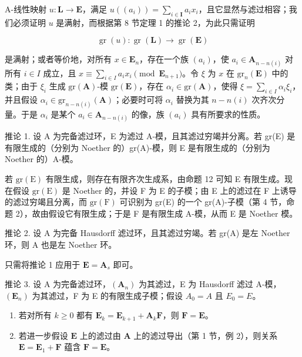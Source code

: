 A-线性映射 \(u: \mathbf{L} \to \mathbf{E}\)，满足 \(u((a_i)) = \sum_{i \in \mathbf{I}} a_i x_i\)，且它显然与滤过相容；我们必须证明 \(u\) 是满射，而根据第 8 节定理 1 的推论 2，为此只需证明

\[
\operatorname{gr} (u): \operatorname{gr} (\mathbf {L}) \rightarrow \operatorname{gr} (\mathbf {E})
\]

	是满射；或者等价地，对所有 \(x \in \mathbf{E}_n\)，存在一个族 \((a_i)\)，使 \(a_i \in \mathbf{A}_{n-n(i)}\) 对所有 \(i \in I\) 成立，且 \(x \equiv \sum_{i \in I} a_i x_i \pmod{\mathbf{E}_{n+1}}\)。令 \(\xi\) 为 \(x\) 在 \(\mathrm{gr}_n(\mathbf{E})\) 中的类；由于 \(\xi_i\) 生成 \(\mathrm{gr}(\mathbf{A})\)-模 \(\mathrm{gr}(\mathbf{E})\)，存在 \(\alpha_i \in \mathrm{gr}(\mathbf{A})\)，使得 \(\xi = \sum_{i \in I} \alpha_i \xi_i\)，并且假设 \(\alpha_i \in \mathrm{gr}_{n-n(i)}(\mathbf{A})\)；必要时可将 \(\alpha_i\) 替换为其 \(n - n(i)\) 次齐次分量。于是 \(\alpha_i\) 是某个 \(a_i \in \mathbf{A}_{n-n(i)}\) 的像，族 \((a_i)\) 具有所要求的性质。

推论 1. 设 A 为完备滤过环，E 为滤过 A-模，且其滤过穷竭并分离。若 gr(E) 是有限生成的（分别为 Noether 的）gr(A)-模，则 E 是有限生成的（分别为 Noether 的）A-模。

若 \(\mathrm{gr}(\mathrm{E})\) 有限生成，则存在有限齐次生成系，由命题 12 可知 E 有限生成。现在假设 \(\mathrm{gr}(\mathrm{E})\) 是 Noether 的，并设 F 为 E 的子模；由 E 上的滤过在 F 上诱导的滤过穷竭且分离，而 \(\mathrm{gr}(\mathrm{F})\) 可识别为 gr(E) 的一个 gr(A)-子模（第 4 节，命题 2），故由假设它有限生成；于是 F 是有限生成 A-模，从而 E 是 Noether 模。

推论 2. 设 A 为完备 Hausdorff 滤过环，且其滤过穷竭。若 gr(A) 是左 Noether 环，则 A 也是左 Noether 环。

只需将推论 1 应用于 \(\mathbf{E} = \mathbf{A}_s\) 即可。

推论 3. 设 A 为完备滤过环，\((\mathbf{A}_{n})\) 为其滤过，E 为 Hausdorff 滤过 A-模，\((\mathbf{E}_{n})\) 为其滤过，F 为 E 的有限生成子模；假设 \(A_{0} = A\) 且 \(E_{0} = E\)。

\begin{enumerate}
\def\labelenumi{(\roman{enumi})}
\item
  若对所有 \(k \geqslant 0\) 都有 \(\mathbf{E}_k = \mathbf{E}_{k+1} + \mathbf{A}_k\mathbf{F}\)，则 \(\mathbf{F} = \mathbf{E}\)。
\item
  若进一步假设 \(\mathbf{E}\) 上的滤过由 \(\mathbf{A}\) 上的滤过导出（第 1 节，例 2），则关系 \(\mathbf{E} = \mathbf{E}_1 + \mathbf{F}\) 蕴含 \(\mathbf{F} = \mathbf{E}\)。
\end{enumerate}

